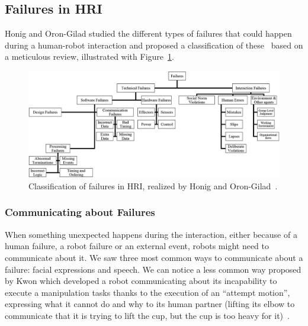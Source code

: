 \documentclass[a4paper,11pt,twoside]{StyleThese}
\begin{document}
\subsection{Failures in HRI}
Honig and Oron-Gilad studied the different types of failures that could happen during a human-robot interaction and proposed a classification of these~\cite{honig_2018_understanding} based on a meticulous review, illustrated with Figure~\ref{chap2:fig:err_hri}.

\begin{figure}[!ht]
	\includegraphics[width=\linewidth]{figures/chapter1/failures_hri.jpg}
	\caption{Classification of failures in HRI, realized by Honig and Oron-Gilad~\cite{honig_2018_understanding}.}
	\label{chap2:fig:err_hri}
\end{figure}

\subsubsection{Communicating about Failures}
When something unexpected happens during the interaction, either because of a human failure, a robot failure or an external event, robots might need to communicate about it. We saw three most common ways to communicate about a failure: facial expressions and speech. We can notice a less common way proposed by Kwon \etal{} which developed a robot communicating about its incapability to execute a manipulation tasks thanks to the execution of an ``attempt motion'', expressing what it cannot do and why to its human partner (\eg lifting its elbow to communicate that it is trying to lift the cup, but the cup is too heavy for it)~\cite{kwon_2018_expressing}. 
\end{document}
